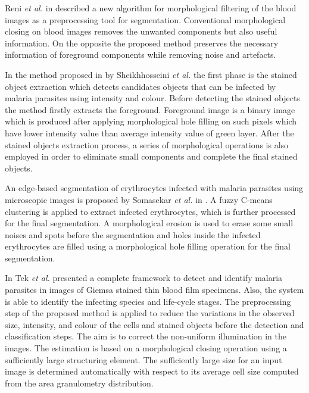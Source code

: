 \documentclass[sensors,review,submit,moreauthors,pdftex,10pt,a4paper]{mdpi}
\begin{document}
Reni \emph{et al.} in \cite{Reni2015} described a new algorithm for morphological filtering of the blood images as a preprocessing tool for segmentation. Conventional morphological closing on blood images removes the unwanted components but also useful information. On the opposite the proposed method preserves the necessary information of foreground components while removing noise and artefacts.

In the method proposed in \cite{Sheik2013} by Sheikhhosseini \emph{et al.} the first phase is the stained object extraction which detects candidates objects that can be infected by malaria parasites using intensity and colour. Before detecting the stained objects the method firstly extracts the foreground. Foreground image is a binary image which is produced after applying morphological hole filling on such pixels which have lower intensity value than average intensity value of green layer. After the stained objects extraction process, a series of morphological operations is also employed in order to eliminate small components and complete the final stained objects.

An edge-based segmentation of erythrocytes infected with malaria parasites using microscopic images is proposed by Somasekar \emph{et al.} in \cite{Somasekar2015}.  A fuzzy C-means clustering is applied to extract infected erythrocytes, which is further processed for the final segmentation. A morphological erosion is used to erase some small noises and spots before the segmentation and holes inside the infected erythrocytes are filled using a morphological hole filling operation for the final segmentation.

In \cite{Tek2010} Tek \emph{et al.} presented a complete framework to detect and identify malaria parasites in images of Giemsa stained thin blood film specimens. Also, the system is able to identify the infecting species and life-cycle stages.
The preprocessing step of the proposed method is applied to reduce the variations in the observed size, intensity, and colour of the cells and stained objects before the detection and classification steps. The aim is to correct the non-uniform illumination in the images. The estimation is based on a morphological closing operation using a sufficiently large structuring element. The sufficiently large size for an input image is determined automatically with respect to its average cell size computed from the area granulometry distribution.
\end{document}
